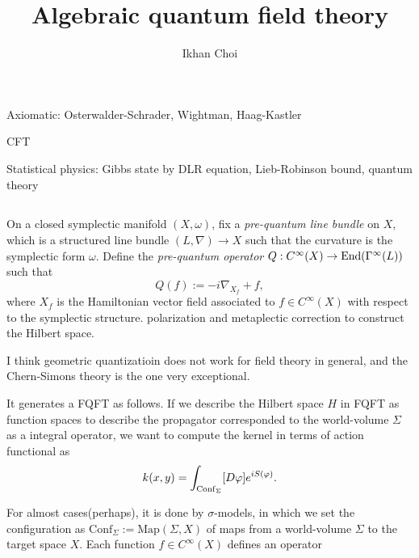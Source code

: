 \documentclass{../../large}
\begin{document}
\title{Algebraic quantum field theory}
\author{Ikhan Choi}
\maketitle
\tableofcontents



\chapter{}

Axiomatic: Osterwalder-Schrader, Wightman, Haag-Kastler

CFT

Statistical physics: Gibbs state by DLR equation, Lieb-Robinson bound, quantum theory

\section{}

\begin{prb}
On a closed symplectic manifold $(X,\omega)$, fix a \emph{pre-quantum line bundle} on $X$, which is a structured line bundle $(L,\nabla)\to X$ such that the curvature is the symplectic form $\omega$.
Define the \emph{pre-quantum operator} $Q:C^\infty(X)\to\operatorname{End}(\Gamma^\infty(L))$ such that
\[Q(f):=-i\nabla_{X_f}+f,\]
where $X_f$ is the Hamiltonian vector field associated to $f\in C^\infty(X)$ with respect to the symplectic structure.
polarization and metaplectic correction to construct the Hilbert space.


I think geometric quantizatioin does not work for field theory in general, and the Chern-Simons theory is the one very exceptional.
\end{prb}

\begin{prb}
\end{prb}

\begin{prb}
It generates a FQFT as follows.
If we describe the Hilbert space $H$ in FQFT as function spaces to describe the propagator corresponded to the world-volume $\Sigma$ as a integral operator, we want to compute the kernel in terms of action functional as
\[k(x,y)=\int_{\mathrm{Conf}_\Sigma}[D\varphi]e^{iS(\varphi)}.\]

For almost cases(perhaps), it is done by $\sigma$-models, in which we set the configuration as $\mathrm{Conf}_\Sigma:=\mathrm{Map}(\Sigma,X)$ of maps from a world-volume $\Sigma$ to the target space $X$.
Each function $f\in C^\infty(X)$ defines an operator
\end{prb}
\end{document}

